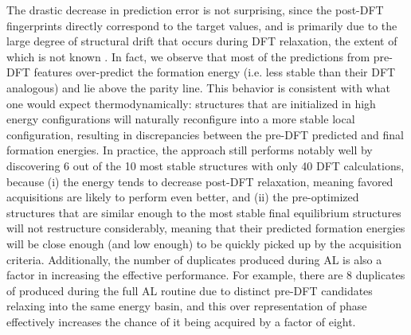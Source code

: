 %
%
%
The drastic decrease in prediction error is not surprising,
since the post-DFT fingerprints directly correspond to the target \DHf values,
and is primarily due to the large degree of structural drift that occurs during DFT relaxation,
the extent of which is not known .
%
In fact, we observe that most of the predictions from pre-DFT features over-predict the formation energy (i.e. less stable than their DFT analogous) and lie above the parity line.
%
This behavior is consistent with what one would expect thermodynamically:
structures that are initialized in high energy configurations will  naturally reconfigure into a more stable local configuration,
resulting in discrepancies between the pre-DFT predicted and final formation energies.
%
In practice, the approach still performs notably well by discovering \num{6} out of the \num{10} most stable structures with only \num{40} DFT calculations, because (i) the energy tends to decrease post-DFT relaxation,
meaning favored acquisitions are likely to perform even better,
and (ii) the pre-optimized structures that are similar enough to the most stable final equilibrium structures will not restructure considerably,
meaning that their predicted formation energies will be close enough (and low enough) to be quickly picked up by the acquisition criteria.
%
Additionally, the number of duplicates produced during AL is also a factor in increasing the effective performance.
%
For example, there are \num{8} duplicates of \aIrOthree produced during the full AL routine due to distinct pre-DFT candidates relaxing into the same energy basin,
and this over representation of \aIrOthree phase effectively increases the chance of it being acquired by a factor of eight.


